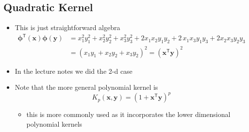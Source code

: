 \documentclass[11pt]{article}
\newcommand{\tr}{\textsf{T}}
\begin{document}
\subsection{Quadratic Kernel}
\label{sec:org61b2618}
\begin{itemize}
\item This is just straightforward algebra
\begin{align*}
   \bm{\phi}^\tr(\bm{x}) \bm{\phi}(\bm{y}) &= x_1^2 y_1^2 + x_2^2
   y_2^2 + x_3^2 y_3^2 + 2 x_1 x_2 y_1 y_2 + 2 \,x_1x_3y_1y_3
+ 2 x_2x_3y_2y_3 \\
  &= (x_1 y_1 + x_2 y_2 +x_3 y_2)^2 = (\bm{x}^\tr\bm{y})^2
\end{align*}
\item In the lecture notes we did the 2-d case
\item Note that the more general polynomial kernel is
$$ K_p(\bm{x},\bm{y})  = (1+\bm{x}^\tr \bm{y})^p $$
\begin{itemize}
\item this is more commonly used as it incorporates the lower
dimensional polynomial kernels
\end{itemize}
\end{itemize}
\end{document}

